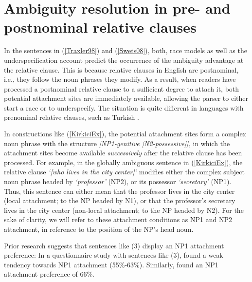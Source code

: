\documentclass[english, doc]{apa7}\usepackage[]{graphicx}\usepackage[]{color}
\begin{document}
\section{Ambiguity resolution in pre- and postnominal relative clauses}

In the sentences in (\ref{Traxler98}) and (\ref{Swets08}), both, race models as well as the underspecification account predict the occurrence of the ambiguity advantage at the relative clause. This is because relative clauses in English are postnominal, i.e., they follow the noun phrases they modify. As a result, when readers have processed a postnominal relative clause to a sufficient degree to attach it, both potential attachment sites are immediately available, allowing the parser to either start a race or to underspecify. The situation is quite different in languages with prenominal relative clauses, such as Turkish \citep{GokselKerslake:2005}.

In constructions like 
(\ref{KirkiciEx}),
the potential attachment sites form a complex noun phrase with the structure \emph{{[}NP1-genitive {[}N2-possessive{]}{]},} in which the attachment sites become available \emph{successively} after the relative clause has been processed. For example, 
in the globally ambiguous sentence in 
(\ref{KirkiciEx}), 
the relative clause \emph{`{[}who lives in the city center{]}'} modifies either the complex subject noun phrase headed by \emph{`professor'} (NP2), or its possessor \emph{`secretary'} (NP1). Thus, this sentence can either mean that the professor lives in the city center (local attachment; to the NP headed by N1), or that the professor's secretary lives in the city center (non-local attachment; to the NP headed by N2). For the sake of clarity, we will refer to these attachment conditions as NP1 and NP2 attachment, in reference to the position of the NP's head noun.

Prior research suggests that sentences like (3) display an NP1 attachment preference: In a questionnaire study with sentences like (3), \cite{Kirkici:2004} found a weak tendency towards NP1 attachment (55\%-63\%). Similarly, \citet{Dincctopal:2010} found an NP1 attachment preference of 66\%.
\end{document}
